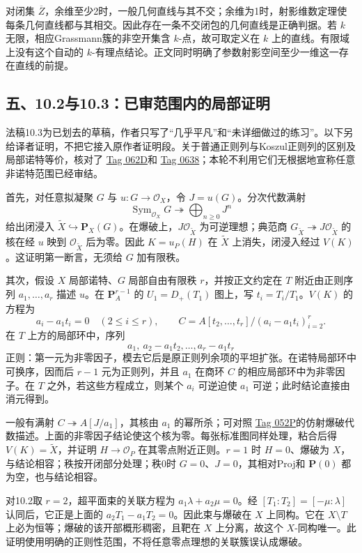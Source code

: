 \documentclass[UTF8,a4paper]{ctexbook}
\begin{document}
对闭集 $\overline Z$，余维至少2时，一般几何直线与其不交；余维为1时，射影维数定理使每条几何直线都与其相交。因此存在一条不交闭包的几何直线是正确判据。若 $k$ 无限，相应Grassmann簇的非空开集含 $k$-点，故可取定义在 $k$ 上的直线。有限域上没有这个自动的 $k$-有理点结论。正文同时明确了参数射影空间至少一维这一存在直线的前提。

\subsection*{五、10.2与10.3：已审范围内的局部证明}
法稿10.3为已划去的草稿，作者只写了“几乎平凡”和“未详细做过的练习”。以下另给译者证明，不把它接入原作者证明段。关于普通正则列与Koszul正则列的区别及局部诺特等价，核对了
\href{https://stacks.math.columbia.edu/tag/062D}{Tag 062D}和
\href{https://stacks.math.columbia.edu/tag/0638}{Tag 0638}；本轮不利用它们无根据地宣称任意非诺特范围已经审结。

首先，对任意拟凝聚 $G$ 与 $u:G\to\mathcal O_X$，令 $J=u(G)$。分次代数满射
\[
 \operatorname{Sym}_{\mathcal O_X}G
 \twoheadrightarrow \bigoplus_{n\ge0}J^n
\]
给出闭浸入 $\widetilde X\hookrightarrow\mathbf P_X(G)$。在爆破上，$J\mathcal O_{\widetilde X}$ 为可逆理想；典范商 $G_{\widetilde X}\twoheadrightarrow J\mathcal O_{\widetilde X}$ 的核在经 $u$ 映到 $\mathcal O_{\widetilde X}$ 后为零。因此 $K=u_P(H)$ 在 $\widetilde X$ 上消失，闭浸入经过 $V(K)$。这证明第一断言，无须给 $G$ 加有限秩。

其次，假设 $X$ 局部诺特、$G$ 局部自由有限秩 $r$，并按正文约定在 $T$ 附近由正则序列 $a_1,\ldots,a_r$ 描述 $u$。在 $\mathbf P^{r-1}_A$ 的 $U_1=D_+(T_1)$ 图上，写 $t_i=T_i/T_1$。$V(K)$ 的方程为
\[
 a_i-a_1t_i=0\quad(2\le i\le r),
 \qquad
 C=A[t_2,\ldots,t_r]/(a_i-a_1t_i)_{i=2}^r.
\]
在 $T$ 上方的局部环中，序列
\[
 a_1,\ a_2-a_1t_2,\ldots,a_r-a_1t_r
\]
正则：第一元为非零因子，模去它后是原正则列余项的平坦扩张。在诺特局部环中可换序，因而后 $r-1$ 元为正则列，并且 $a_1$ 在商环 $C$ 的相应局部环中为非零因子。在 $T$ 之外，若这些方程成立，则某个 $a_i$ 可逆迫使 $a_1$ 可逆；此时结论直接由消元得到。

一般有满射 $C\twoheadrightarrow A[J/a_1]$，其核由 $a_1$ 的幂所杀；可对照
\href{https://stacks.math.columbia.edu/tag/052P}{Tag 052P}的仿射爆破代数描述。上面的非零因子结论使这个核为零。每张标准图同样处理，粘合后得 $V(K)=\widetilde X$，并证明 $H\to\mathcal O_P$ 在其零点附近正则。$r=1$ 时 $H=0$、爆破为 $X$，与结论相容；秩按开闭部分处理；秩0时 $G=0$、$J=0$，其相对Proj和 $\mathbf P(0)$ 都为空，也与结论相容。

对10.2取 $r=2$，超平面束的关联方程为 $a_1\lambda+a_2\mu=0$。经 $[T_1:T_2]=[-\mu:\lambda]$ 认同后，它正是上面的 $a_2T_1-a_1T_2=0$。因此束与爆破在 $X$ 上同构。它在 $X\setminus T$ 上必为恒等；爆破的该开部概形稠密，且靶在 $X$ 上分离，故这个 $X$-同构唯一。此证明使用明确的正则性范围，不将任意零点理想的关联簇误认成爆破。
\end{document}
